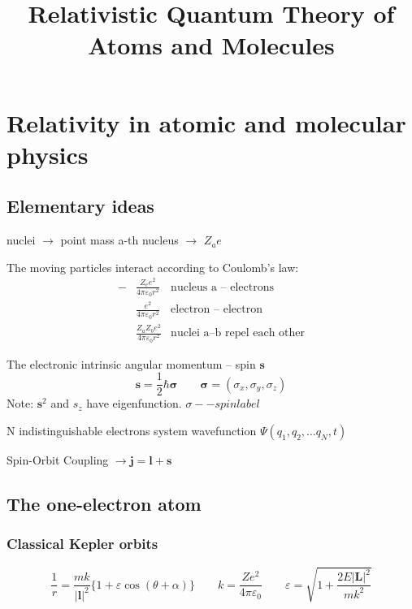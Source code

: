 \documentclass[a4paper,lang=cn,a4paper]{elegantpaper}
\title{Relativistic Quantum Theory of Atoms and Molecules}
\date{}
\newcommand{\vect}[1]{\boldsymbol{#1}}
\begin{document}
\maketitle
\section{Relativity in atomic and molecular physics}

\subsection{Elementary ideas}
nuclei $\longrightarrow$ point mass \hspace{3cm}
a-th nucleus $\longrightarrow$ $Z_a e$

The moving particles interact according to Coulomb's law:
\begin{align*}
    -&\frac{Z_e e^2}{4\pi \varepsilon_0 r^2} & \text{nucleus a -- electrons}\\[1em]
    & \frac{e^2}{4\pi \varepsilon_0 r^2} & \text{electron -- electron}\\[1em]
    & \frac{Z_a Z_b e^2}{4\pi \varepsilon_0 r^2} & \text{nuclei a--b repel each other}
\end{align*}

The electronic intrinsic angular momentum -- spin $\vect{s}$
\begin{equation*}
    \vect{s}=\frac{1}{2}\hbar\vect{\sigma} \qquad \vect{\sigma}=(\sigma_x, \sigma_y, \sigma_z)
\end{equation*}
Note: $\vect{s}^2$ and $s_z$ have eigenfunction. $\sigma -- spin label $

N indistinguishable electrons system wavefunction $\Psi(q_1, q_2,\dotsc q_N,t)$

Spin-Orbit Coupling $\longrightarrow \vect{j}=\vect{l}+\vect{s}$

\subsection{The one-electron atom}
\subsubsection{Classical Kepler orbits}
\begin{equation*}
    \frac{1}{r}=\frac{mk}{|\vect{l}|^2}\{1+\varepsilon\cos(\theta+\alpha)\} \qquad
    k=\frac{Ze^2}{4\pi\varepsilon_0} \qquad \varepsilon=\sqrt{1+\frac{2E|\vect{L}|^2}{mk^2}}
\end{equation*}
\end{document}
